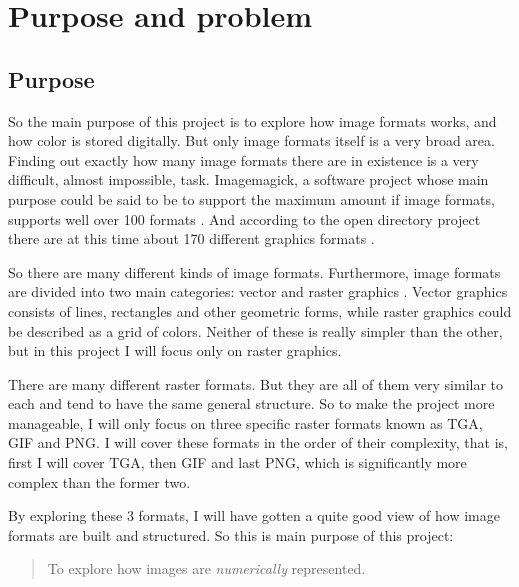 \begin{comment}
  
\end{comment}

\chapter{Purpose and problem}

\section{Purpose}

So the main purpose of this project is to explore how image formats
works, and how color is stored digitally. But only image formats
itself is a very broad area. Finding out exactly how many image
formats there are in existence is a very difficult, almost impossible,
task. Imagemagick, a software project whose main purpose could be said
to be to support the maximum amount if image formats, supports well
over 100 formats \cite{11:imagemagick_home}. And according to the open
directory project there are at this time about 170 different graphics
formats \cite{10:opendirectory_data_formats}.

So there are many different kinds of image formats. Furthermore, image
formats are divided into two main categories: vector and raster
graphics \cite{murray1996encyclopedia,roelofs99:_png}. Vector graphics
consists of lines, rectangles and other geometric forms, while raster
graphics could be described as a grid of colors. Neither of these is
really simpler than the other, but in this project I will focus only
on raster graphics.

There are many different raster formats. But they are all of them very
similar to each and tend to have the same general structure. So to
make the project more manageable, I will only focus on three specific
raster formats known as TGA, GIF and PNG. I will cover these formats
in the order of their complexity, that is, first I will cover TGA,
then GIF and last PNG, which is significantly more complex than the
former two.

By exploring these 3 formats, I will have gotten a quite good view of
how image formats are built and structured. So this is main purpose of
this project:

\begin{quote}
  To explore how images are \textit{numerically} represented.
\end{quote}